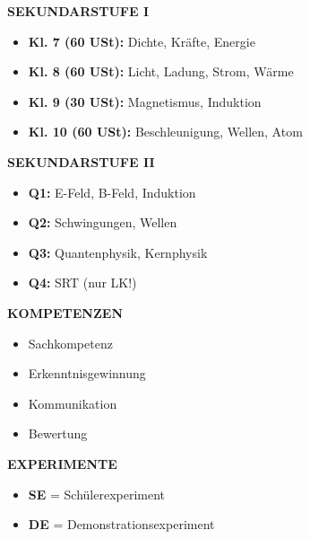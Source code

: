 \documentclass[11pt,a4paper]{article}
\newcommand{\SE}{\textcolor{accentgreen}{\textbf{SE}}}
\newcommand{\DE}{\textcolor{physikblue}{\textbf{DE}}}
\begin{document}
\begin{minipage}[t]{0.48\textwidth}
\textbf{\color{physikblue}SEKUNDARSTUFE I}
\begin{itemize}[leftmargin=0.3cm, itemsep=1pt, topsep=2pt]
\item \textbf{Kl. 7 (60 USt):} Dichte, Kräfte, Energie
\item \textbf{Kl. 8 (60 USt):} Licht, Ladung, Strom, Wärme
\item \textbf{Kl. 9 (30 USt):} Magnetismus, Induktion
\item \textbf{Kl. 10 (60 USt):} Beschleunigung, Wellen, Atom
\end{itemize}

\vspace{0.2cm}
\textbf{\color{physikblue}SEKUNDARSTUFE II}
\begin{itemize}[leftmargin=0.3cm, itemsep=1pt, topsep=2pt]
\item \textbf{Q1:} E-Feld, B-Feld, Induktion
\item \textbf{Q2:} Schwingungen, Wellen
\item \textbf{Q3:} Quantenphysik, Kernphysik
\item \textbf{Q4:} SRT (nur LK!)
\end{itemize}

\vspace{0.2cm}
\textbf{\color{physikblue}KOMPETENZEN}
\begin{itemize}[leftmargin=0.3cm, itemsep=1pt, topsep=2pt]
\item [S] Sachkompetenz
\item [E] Erkenntnisgewinnung
\item [K] Kommunikation
\item [B] Bewertung
\end{itemize}

\vspace{0.2cm}
\textbf{\color{physikblue}EXPERIMENTE}
\begin{itemize}[leftmargin=0.3cm, itemsep=1pt, topsep=2pt]
\item \SE{} = Schülerexperiment
\item \DE{} = Demonstrationsexperiment
\end{itemize}
\end{minipage}
\hfill
\end{document}
